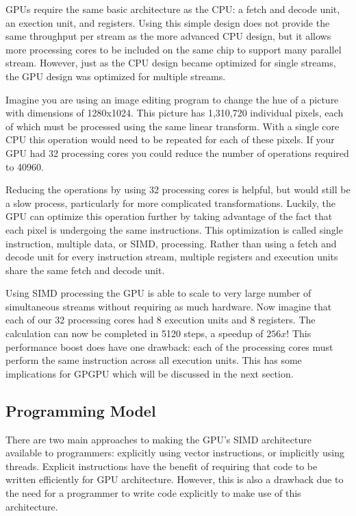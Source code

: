 GPUs require the same basic architecture as the CPU: a fetch and decode unit, an exection unit, and registers. Using this simple design does not provide the same throughput per stream as the more advanced CPU design, but it allows more processing cores to be included on the same chip to support many parallel stream. However, just as the CPU design became optimized for single streams, the GPU design was optimized for multiple streams.

Imagine you are using an image editing program to change the hue of a picture with dimensions of 1280x1024. This picture has 1,310,720 individual pixels, each of which must be processed using the same linear transform. With a single core CPU this operation would need to be repeated for each of these pixels. If your GPU had 32 processing cores you could reduce the number of operations required to 40960.

Reducing the operations by using 32 processing cores is helpful, but would still be a slow process, particularly for more complicated transformations. Luckily, the GPU can optimize this operation further by taking advantage of the fact that each pixel is undergoing the same instructions. This optimization is called single instruction, multiple data, or SIMD, processing. Rather than using a fetch and decode unit for every instruction stream, multiple registers and execution units share the same fetch and decode unit.

Using SIMD processing the GPU is able to scale to very large number of simultaneous streams without requiring as much hardware. Now imagine that each of our 32 processing cores had 8 execution units and 8 registers. The calculation can now be completed in 5120 steps, a speedup of $256x$! This performance boost does have one drawback: each of the processing cores must perform the same instruction across all execution units. This has some implications for GPGPU which will be discussed in the next section.

\subsection{Programming Model}

There are two main approaches to making the GPU's SIMD architecture available to programmers: explicitly using vector instructions, or implicitly using threads. Explicit instructions have the benefit of requiring that code to be written efficiently for GPU architecture. However, this is also a drawback due to the need for a programmer to write code explicitly to make use of this architecture. \cite{GPGPU}

